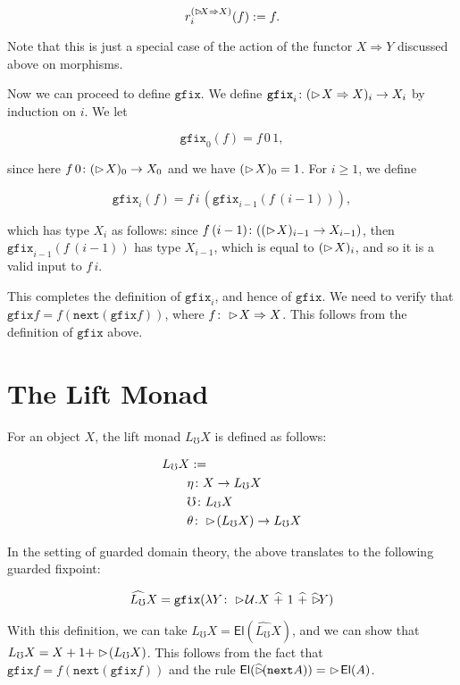 \documentclass{article}
\newcommand{\later}{\vartriangleright\hspace{-2px}}
\newcommand{\nxt}{\texttt{next}}
\newcommand{\gfix}{\texttt{gfix}}
\newcommand{\calU}{\mathcal{U}}
\newcommand{\laterhat}{\widehat{\later}}
\newcommand{\El}{\mathsf{El}}
\newcommand{\lift}{L_\mho}
\newcommand{\lifthat}{\widehat{L_\mho}}
\newcommand{\To}{\Rightarrow}
\begin{document}
\[
    r_i^{(\later X \To X)} (f) := f.
\]

Note that this is just a special case of the action of the functor $X \To Y$
discussed above on morphisms.



\vspace{4ex}

Now we can proceed to define $\gfix$. We define $\gfix_i \colon (\later X \To X)_i \to X_i$
by induction on $i$. We let

\[
    \gfix_0 (f) = f\, 0\, 1,
\]

since here $f\, 0 \colon (\later X)_0 \to X_0$ and we have $(\later X)_0 = 1$.
For $i \ge 1$, we define

\[
    \gfix_i (f) = f\, i\, (\gfix_{i-1} (f\, (i-1))),
\]

which has type $X_i$ as follows: since $f\, (i-1) \colon ((\later X)_{i-1} \to X_{i-1})$,
then $\gfix_{i-1}(f\, (i-1))$ has type $X_{i-1}$, which is equal to $(\later X)_i$,
and so it is a valid input to $f\, i$.

This completes the definition of $\gfix_i$, and hence of $\gfix$.
We need to verify that $\gfix f = f (\nxt (\gfix f))$, where $f \colon \later X \To X$.
This follows from the definition of $\gfix$ above.



\section{The Lift Monad}

For an object $X$, the lift monad $\lift X$ is defined as follows:

\begin{align*}
    &\lift X := \\
    &\quad\quad    \eta \colon X \to \lift X \\
    &\quad\quad    \mho \colon \lift X \\
    &\quad\quad    \theta \colon \later (\lift X) \to \lift X
\end{align*}


In the setting of guarded domain theory, the above translates to
the following guarded fixpoint:

\[
    \lifthat X = \gfix(\lambda Y \colon \later \calU . 
      X \,\, \widehat{+} \,\, 1 \,\, \widehat{+} \,\, \widehat{\later} Y)
\]

With this definition, we can take $\lift X = \El(\lifthat X)$,
and we can show that $\lift X = X + 1 + \later (\lift X)$.
This follows from the fact that $\gfix f = f (\nxt (\gfix f))$ and
the rule $\El(\laterhat(\nxt A)) =\,\, \later \El(A)$.
\end{document}
